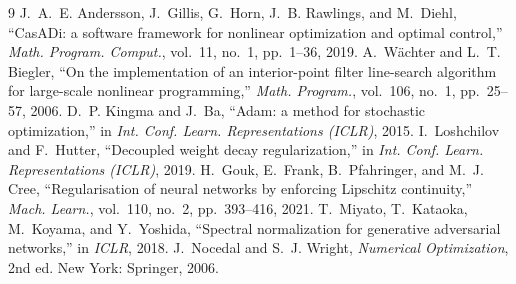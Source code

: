 \documentclass[conference]{IEEEtran}
\begin{document}
\begin{thebibliography}{9}
 J.~A.~E. Andersson, J.~Gillis, G.~Horn, J.~B. Rawlings, and
M.~Diehl, ``CasADi: a software framework for nonlinear optimization and optimal
control,'' \emph{Math. Program. Comput.}, vol.~11, no.~1, pp.~1--36, 2019.
 A.~W\"achter and L.~T. Biegler, ``On the implementation of an
interior-point filter line-search algorithm for large-scale nonlinear
programming,'' \emph{Math. Program.}, vol.~106, no.~1, pp.~25--57, 2006.
 D.~P. Kingma and J.~Ba, ``Adam: a method for stochastic
optimization,'' in \emph{Int. Conf. Learn. Representations (ICLR)}, 2015.
 I.~Loshchilov and F.~Hutter, ``Decoupled weight decay
regularization,'' in \emph{Int. Conf. Learn. Representations (ICLR)}, 2019.
 H.~Gouk, E.~Frank, B.~Pfahringer, and M.~J. Cree, ``Regularisation
of neural networks by enforcing Lipschitz continuity,'' \emph{Mach. Learn.},
vol.~110, no.~2, pp.~393--416, 2021.
 T.~Miyato, T.~Kataoka, M.~Koyama, and Y.~Yoshida, ``Spectral
normalization for generative adversarial networks,'' in \emph{ICLR}, 2018.
 J.~Nocedal and S.~J. Wright, \emph{Numerical
Optimization}, 2nd ed. New York: Springer, 2006.
\end{thebibliography}
\end{document}
